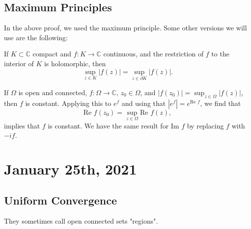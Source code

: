 \documentclass[12pt]{scrartcl}
\newcommand{\C}{\mathbb C}
\let \ol \overline
\begin{document}
\subsection{Maximum Principles} 
In the above proof, we used the maximum principle.  Some other versions we will use are the following:
 
 If $K \subset \C$ compact and $f:K \to \C$ continuous, and the restriction of $f$ to the interior of $K$ is holomorphic, then 
 $$\sup_{z \in K} |f(z)| = \sup_{z \in \partial K} |f(z)|.$$
 
If $\Omega$ is open and connected, $f: \Omega \to \C$, $z_0 \in \Omega$, and $|f(z_0)| = \sup_{z \in \Omega} |f(z)|$, then $f$ is constant.  Applying this to $e^f$ and using that $|e^f| = e^{\text{Re }f}$, we find that 
$$\text{Re }f(z_0) = \sup_{z \in \Omega} \text{Re }f(z),$$
implies that $f$
 is constant.   We have the same result for $\text{Im }f$ by replacing $f$ with $-if$.  
 
%
%
\pagebreak
\section{January 25th, 2021}
\subsection{Uniform Convergence}
\begin{remark} They sometimes call open connected sets "regions".
\end{remark}
\end{document}
